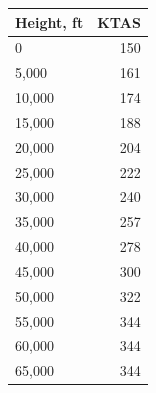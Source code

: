 \begin{tabular}{@{}lr@{}}
\toprule
Height, ft & KTAS \\
\midrule
0 & 150 \\
5,000 & 161 \\
10,000 & 174 \\
15,000 & 188 \\
20,000 & 204 \\
25,000 & 222 \\
30,000 & 240 \\
35,000 & 257 \\
40,000 & 278 \\
45,000 & 300 \\
50,000 & 322 \\
55,000 & 344 \\
60,000 & 344 \\
65,000 & 344 \\
\bottomrule
\end{tabular}
